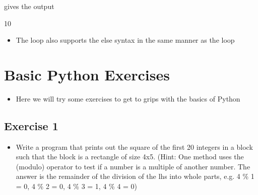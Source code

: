 \documentclass[letterpaper,10pt,english,openany]{sphinxmanual}
\begin{document}
\begin{sphinxVerbatim}[commandchars=\\\{\}]
  
   
         

      
\end{sphinxVerbatim}

gives the output

\begin{sphinxVerbatim}[commandchars=\\\{\}]
10
\end{sphinxVerbatim}
\begin{itemize}
\item {} 
The  loop also supports the else syntax in the same manner
as the  loop

\end{itemize}



\section{Basic Python Exercises}
\label{\detokenize{introduction_to_python/basic_python_exercises_1-2:basic-python-exercises}}\label{\detokenize{introduction_to_python/basic_python_exercises_1-2:basic-python-exercises-1-2}}\label{\detokenize{introduction_to_python/basic_python_exercises_1-2::doc}}\begin{itemize}
\item {} 
Here we will try some exercises to get to grips with the basics of
Python

\end{itemize}


\subsection{Exercise 1}
\label{\detokenize{introduction_to_python/basic_python_exercises_1-2:exercise-1}}\begin{itemize}
\item {} 
Write a program that prints out the square of the first 20 integers
in a block such that the block is a rectangle of size 4x5. (Hint: One
method uses the \sphinxcode{\sphinxupquote{\%}} (modulo) operator to test if a number is a
multiple of another number. The answer is the remainder of the
division of the lhs into whole parts, e.g. 4 \% 1 = 0, 4 \% 2 = 0, 4 \%
3 = 1, 4 \% 4 = 0)

\end{itemize}
\end{document}
